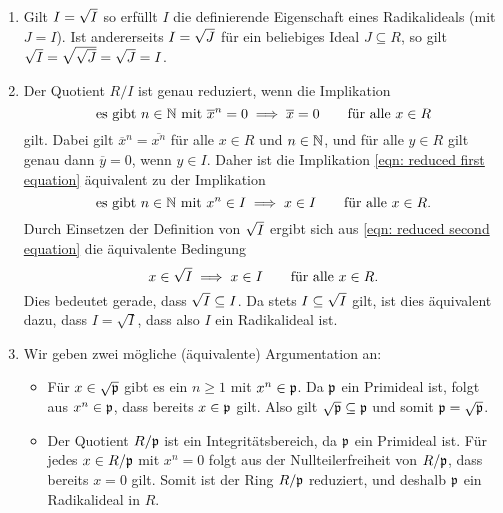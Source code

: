 \begin{solution}
\begin{enumerate}
    \item
      Gilt $I = \sqrt{I}$ so erfüllt $I$ die definierende Eigenschaft eines Radikalideals (mit $J = I$).
      Ist andererseits $I = \sqrt{J}$ für ein beliebiges Ideal $J \subseteq R$, so gilt $\sqrt{I} = \sqrt{\sqrt{J}} = \sqrt{J} = I$.
      
    \item
      Der Quotient $R/I$ ist genau reduziert, wenn die Implikation
      \begin{equation}
        \label{eqn: reduced first equation}
        \text{es gibt $n \in \mathbb{N}$ mit $\overline{x}^n = 0$}
        \implies
        \overline{x} = 0
        \qquad
        \text{für alle $x \in R$}
      \end{equation}
      gilt.
      Dabei gilt $\overline{x}^n = \overline{x^n}$ für alle $x \in R$ und $n \in \mathbb{N}$, und für alle $y \in R$ gilt genau dann $\overline{y} = 0$, wenn $y \in I$.
      Daher ist die Implikation \eqref{eqn: reduced first equation} äquivalent zu der Implikation
      \begin{equation}
        \label{eqn: reduced second equation}
        \text{es gibt $n \in \mathbb{N}$ mit $x^n \in I$}
        \implies
        x \in I
        \qquad
        \text{für alle $x \in R$}.
      \end{equation}
      Durch Einsetzen der Definition von $\sqrt{I}$ ergibt sich aus \eqref{eqn: reduced second equation} die äquivalente Bedingung
      \[
        x \in \sqrt{I}
        \implies
        x \in I
        \qquad
        \text{für alle $x \in R$}.
      \]
      Dies bedeutet gerade, dass $\sqrt{I} \subseteq I$.
      Da stets $I \subseteq \sqrt{I}$ gilt, ist dies äquivalent dazu, dass $I = \sqrt{I}$, dass also $I$ ein Radikalideal ist.
      
    \item
      Wir geben zwei mögliche (äquivalente) Argumentation an:
      \begin{itemize}
        \item
          Für $x \in \sqrt{\mathfrak{p}}$ gibt es ein $n \geq 1$ mit $x^n \in \mathfrak{p}$.
          Da $\mathfrak{p}$ ein Primideal ist, folgt aus $x^n \in \mathfrak{p}$, dass bereits $x \in \mathfrak{p}$ gilt.
          Also gilt $\sqrt{\mathfrak{p}} \subseteq \mathfrak{p}$ und somit $\mathfrak{p} = \sqrt{\mathfrak{p}}$.
        \item
          Der Quotient $R/\mathfrak{p}$ ist ein Integritätsbereich, da $\mathfrak{p}$ ein Primideal ist.
          Für jedes $x \in R/\mathfrak{p}$ mit $x^n = 0$ folgt aus der Nullteilerfreiheit von $R/\mathfrak{p}$, dass bereits $x = 0$ gilt.
          Somit ist der Ring $R/\mathfrak{p}$ reduziert, und deshalb $\mathfrak{p}$ ein Radikalideal in $R$.
      \end{itemize}
  \end{enumerate}
\end{solution}


